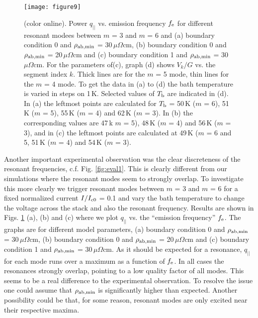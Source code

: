 \documentclass[aps,twocolumn,prb,showpacs,preprintnumbers,superscriptaddress,amsmath,amssymb,longbibliography]{revtex4-1}
\begin{document}
\begin{figure}[b]
\texttt{[image: figure9]}
\caption{(color online). Power  $q_{||}$ vs. emission frequency $f_{\rm e}$ for different resonant modees between $m$ = 3 and $m$ = 6 and (a) boundary condition 0 and $\rho_{\rm {ab,min}}$ = 30\,$\mu\Omega$cm, (b) boundary condition 0 and $\rho_{\rm {ab,min}}$ = 20\,$\mu\Omega$cm and (c) boundary condition 1 and $\rho_{\rm {ab,min}}$ = 30\,$\mu\Omega$cm. For the parameters of(c), graph (d) shows $V_k/G$ vs. the segment index $k$. Thick lines are for the $m$ = 5 mode, thin lines for the $m$ = 4 mode. 
To get the data in (a) to (d) the bath temperature is varied in steps on 1\,K. Selected values of $T_{\rm b}$ are indicated in (d). In (a) the leftmost points are calculated for $T_{\rm b}$ = 50\,K ($m$ = 6), 51\,K ($m$ = 5), 55\,K ($m$ = 4) and 62\,K ($m$ = 3). In (b) the corresponding values are 47\,k $m$ = 5), 48\,K ($m$ = 4) and 56\,K ($m$ = 3), and in (c) the leftmost points are calculated at 49\,K ($m$ = 6 and 5, 51\,K ($m$ = 4) and 54\,K ($m$ = 3). 
}
\label{fig:ResoTb}
\end{figure}

Another important experimental observation was the clear discreteness of the resonant frequencies, c.f. Fig. \ref{fig:eval1}. This is clearly different from our simulations where the resonant modes seem to strongly overlap. To investigate this more clearly we trigger resonant modes between $m$ = 3 and $m$ = 6 for a fixed normalized current $I/I_{\rm c0}$ = 0.1 and vary the bath temperature to change the voltage across the stack and also the resonant frequency. Results are shown in Figs. \ref{fig:ResoTb} (a), (b) and (c) where we plot $q_{||}$ vs. the ``emission frequency'' $f_{\rm e}$. The graphs are for different model parameters, (a) boundary condition 0 and $\rho_{\rm {ab,min}}$ = 30\,$\mu\Omega$cm, (b) boundary condition 0 and $\rho_{\rm {ab,min}}$ = 20\,$\mu\Omega$cm and (c) boundary condition 1 and $\rho_{\rm {ab,min}}$ = 30\,$\mu\Omega$cm. 
As it should be expected for a resonance, $q_{||}$ for each mode runs over a maximum as a function of $f_{\rm e}$. In all cases the resonances strongly overlap, pointing to a low quality factor of all modes. This seems to be a real difference to the experimental observation. To resolve the issue one could assume that $\rho_{\rm {ab,min}}$ is significantly higher than expected. Another possibility could be that, for some reason, resonant modes are only excited near their respective maxima. 
\end{document}
